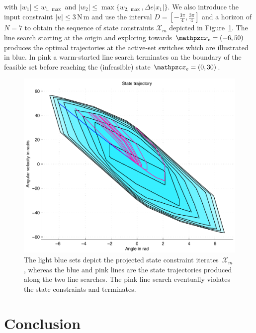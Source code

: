\documentclass{ifacconf}
\providecommand{\abs}[1]{\left|#1\right|}
\begin{document}
with $\abs{w_1}\leq w_{1,\max}$ and $\abs{w_2}\leq\max\{w_{2,\max},\Delta e \abs{x_1}\}$.
We also introduce the input constraint $\abs{u}\leq3$\,N\,m and use the interval $D = [-\frac{3\pi}{4},
\frac{3\pi}{4}]$ and a horizon of $N=7$ to obtain the sequence of state constraints $\mathcal X_m$
depicted in Figure~\ref{fig:numerical:example}. The line search starting at the origin and
exploring towards $\mathpzc x_e=(-6,50)$ produces the optimal trajectories at the active-set switches
which are illustrated in blue. In pink a warm-started line search terminates on the boundary of the
feasible set before reaching the (infeasible) state $\mathpzc x_e=(0,30)$.

\begin{figure}
\includegraphics[width=.48\textwidth]{res}
\caption{The light blue sets depict the projected state constraint iterates~$\mathcal X_m$,
    whereas the blue and pink lines are the state trajectories produced along the two line
    searches. The pink line search eventually violates the state constraints and terminates.}
\label{fig:numerical:example}
\end{figure}
\section{Conclusion}\label{sec:conclusion}

\end{document}
